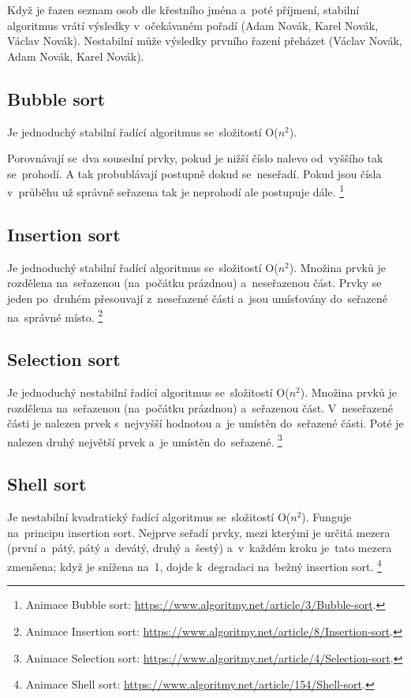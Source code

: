 Když je řazen seznam osob dle křestního jména a~poté příjmení, stabilní algoritmus vrátí výsledky v~očekávaném pořadí (Adam Novák, Karel Novák, Václav Novák). Nestabilní může výsledky prvního řazení přeházet (Václav Novák, Adam Novák, Karel Novák).

\subsection{Bubble sort}

Je jednoduchý stabilní řadící algoritmus se~složitostí O(\( n^2 \)).

Porovnávají se~dva sousední prvky, pokud je nižší číslo nalevo od~vyššího tak se~prohodí. A tak probublávají postupně dokud se~neseřadí. Pokud jsou čísla v~průběhu už správně seřazena tak je neprohodí ale postupuje dále.%
\footnote{Animace Bubble sort: \url{https://www.algoritmy.net/article/3/Bubble-sort}.}

\subsection{Insertion sort}

Je jednoduchý stabilní řadící algoritmus se~složitostí O(\( n^2 \)). Množina prvků je rozdělena na~seřazenou (na~počátku prázdnou) a~neseřazenou část. Prvky se jeden po~druhém přesouvají z~neseřazené části a~jsou umísťovány do~seřazené na~správné místo.%
\footnote{Animace Insertion sort: \url{https://www.algoritmy.net/article/8/Insertion-sort}.}

\subsection{Selection sort}

Je jednoduchý nestabilní řadící algoritmus se~složitostí O(\( n^2 \)). Množina prvků je rozdělena na~seřazenou (na~počátku prázdnou) a~seřazenou část. V~neseřazené části je nalezen prvek s~nejvyšší hodnotou a~je umístěn do~seřazené části. Poté je nalezen druhý největší prvek a~je umístěn do~seřazené.%
\footnote{Animace Selection sort: \url{https://www.algoritmy.net/article/4/Selection-sort}.}

\subsection{Shell sort}

Je nestabilní kvadratický řadící algoritmus se~složitostí O(\( n^2 \)). Funguje na~principu insertion sort. Nejprve seřadí prvky, mezi kterými je určitá mezera (první a~pátý, pátý a~devátý, druhý a~šestý) a~v~každém kroku je~tato mezera zmenšena; když je snížena na~1, dojde k~degradaci na~bežný insertion sort.%
\footnote{Animace Shell sort: \url{https://www.algoritmy.net/article/154/Shell-sort}.}

